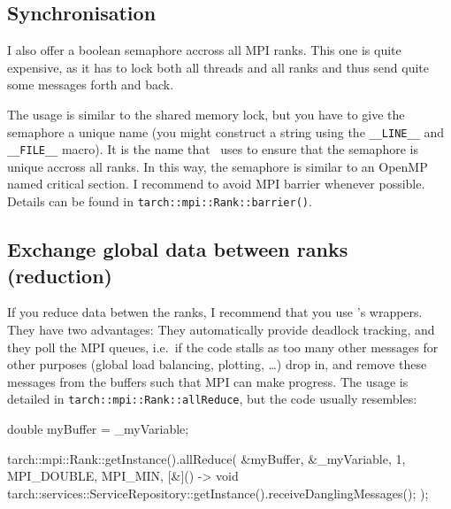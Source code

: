 \subsection{Synchronisation}

I also offer a boolean semaphore accross all MPI ranks. This one is quite
expensive, as it has to lock both all threads and all ranks and thus send
quite some messages forth and back. 

The usage is similar to the shared memory lock, but you have to give the
semaphore a unique name (you might construct a string using the
\texttt{\_\_LINE\_\_} and \texttt{\_\_FILE\_\_} macro). 
It is the name that \Peano\ uses to ensure that the semaphore is unique accross
all ranks.
In this way, the semaphore is similar to an OpenMP named critical section.
I recommend to avoid MPI barrier whenever possible.
Details can be found in \texttt{tarch::mpi::Rank::barrier()}.



\subsection{Exchange global data between ranks (reduction)}
\label{section:parallel-programming:shared-mem:reductions}

If you reduce data betwen the ranks, I recommend that you use \Peano's wrappers.
They have two advantages: 
They automatically provide deadlock tracking, and they poll the MPI queues,
i.e.~if the code stalls as too many other messages for other purposes (global
load balancing, plotting, \ldots) drop in, and remove these messages from the
buffers such that MPI can make progress. The usage is detailed in
\texttt{tarch::mpi::Rank::allReduce}, but the code usually resembles:

\begin{code}
double myBuffer = _myVariable;

tarch::mpi::Rank::getInstance().allReduce(
  &myBuffer,
  &_myVariable,
  1, MPI_DOUBLE,
  MPI_MIN,
  [&]() -> void { tarch::services::ServiceRepository::getInstance().receiveDanglingMessages(); }
);
\end{code}
      